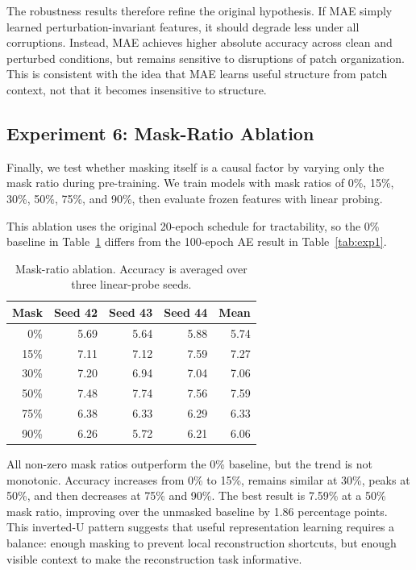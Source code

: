 \documentclass[10pt,twocolumn,letterpaper]{article}
\begin{document}
The robustness results therefore refine the original hypothesis. If MAE simply learned perturbation-invariant features, it should degrade less under all corruptions. Instead, MAE achieves higher absolute accuracy across clean and perturbed conditions, but remains sensitive to disruptions of patch organization. This is consistent with the idea that MAE learns useful structure from patch context, not that it becomes insensitive to structure.

\subsection{Experiment 6: Mask-Ratio Ablation}

Finally, we test whether masking itself is a causal factor by varying only the mask ratio during pre-training. We train models with mask ratios of 0\%, 15\%, 30\%, 50\%, 75\%, and 90\%, then evaluate frozen features with linear probing.

This ablation uses the original 20-epoch schedule for tractability, so the 0\% baseline in Table~\ref{tab:exp6} differs from the 100-epoch AE result in Table~\ref{tab:exp1}.

\begin{table}[t]
\centering
\caption{Mask-ratio ablation. Accuracy is averaged over three linear-probe seeds.}
\label{tab:exp6}
\begin{tabular}{rrrrr}
\toprule
Mask & Seed 42 & Seed 43 & Seed 44 & Mean \\
\midrule
0\%  & 5.69 & 5.64 & 5.88 & 5.74 \\
15\% & 7.11 & 7.12 & 7.59 & 7.27 \\
30\% & 7.20 & 6.94 & 7.04 & 7.06 \\
50\% & 7.48 & 7.74 & 7.56 & 7.59 \\
75\% & 6.38 & 6.33 & 6.29 & 6.33 \\
90\% & 6.26 & 5.72 & 6.21 & 6.06 \\
\bottomrule
\end{tabular}
\end{table}

All non-zero mask ratios outperform the 0\% baseline, but the trend is not monotonic. Accuracy increases from 0\% to 15\%, remains similar at 30\%, peaks at 50\%, and then decreases at 75\% and 90\%. The best result is 7.59\% at a 50\% mask ratio, improving over the unmasked baseline by 1.86 percentage points. This inverted-U pattern suggests that useful representation learning requires a balance: enough masking to prevent local reconstruction shortcuts, but enough visible context to make the reconstruction task informative.
\end{document}
